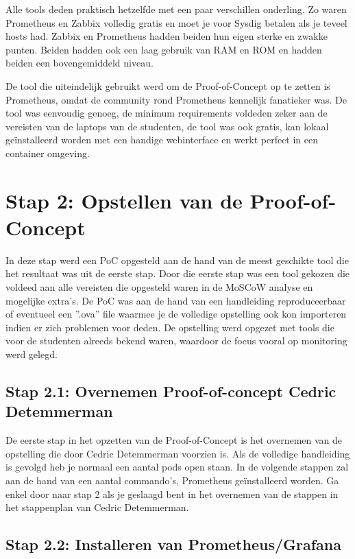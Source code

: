 Alle tools deden praktisch hetzelfde met een paar verschillen onderling. Zo waren Prometheus en Zabbix volledig gratis en moet je voor Sysdig betalen als je teveel hosts had. Zabbix en Prometheus hadden beiden hun eigen sterke en zwakke punten. Beiden hadden ook een laag gebruik van RAM en ROM en hadden beiden een bovengemiddeld niveau.

De tool die uiteindelijk gebruikt werd om de Proof-of-Concept op te zetten is Prometheus, omdat de community rond Prometheus kennelijk fanatieker was. De tool was eenvoudig genoeg, de minimum requirements voldeden zeker aan de vereisten van de laptops van de studenten, de tool was ook gratis, kan lokaal geïnstalleerd worden met een handige webinterface en werkt perfect in een container omgeving.

\section{Stap 2: Opstellen van de Proof-of-Concept}

In deze stap werd een PoC opgesteld aan de hand van de meest geschikte tool die het resultaat was uit de eerste stap. Door die eerste stap was een tool gekozen die voldeed aan alle vereisten die opgesteld waren in de MoSCoW analyse en mogelijke extra's. De PoC was aan de hand van een handleiding reproduceerbaar of eventueel een ''.ova'' file waarmee je de volledige opstelling ook kon importeren indien er zich problemen voor deden. De opstelling werd opgezet met tools die voor de studenten alreeds bekend waren, waardoor de focus vooral op monitoring werd gelegd.

\subsection{Stap 2.1: Overnemen Proof-of-concept Cedric Detemmerman}

De eerste stap in het opzetten van de Proof-of-Concept is het overnemen van de opstelling die door Cedric Detemmerman voorzien is.  Als de volledige handleiding is gevolgd heb je normaal een aantal pods open staan. In de volgende stappen zal aan de hand van een aantal commando's, Prometheus geïnstalleerd worden. Ga enkel door naar stap 2 als je geslaagd bent in het overnemen van de stappen in het stappenplan van Cedric Detemmerman. 

\subsection{Stap 2.2: Installeren van Prometheus/Grafana}

